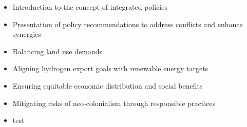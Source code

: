 \begin{itemize}
    \item Introduction to the concept of integrated policies
    \item Presentation of policy recommendations to address conflicts and enhance synergies
    \item Balancing land use demands
    \item Aligning hydrogen export goals with renewable energy targets
    \item Ensuring equitable economic distribution and social benefits
    \item Mitigating risks of neo-colonialism through responsible practices
    \item test
\end{itemize}